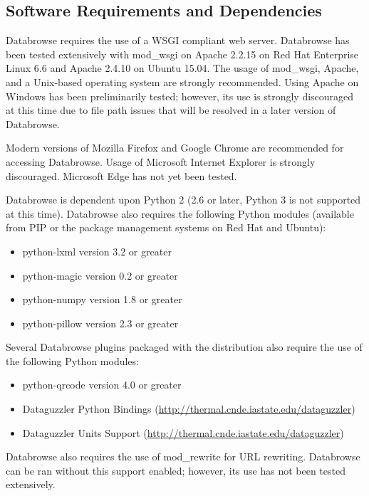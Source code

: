 \documentclass[10pt]{article}
\begin{document}
\subsection{Software Requirements and Dependencies}

Databrowse requires the use of a WSGI compliant web server.  Databrowse has been tested extensively with mod\_wsgi on Apache 2.2.15 on Red Hat Enterprise Linux 6.6 and Apache 2.4.10 on Ubuntu 15.04.  The usage of mod\_wsgi, Apache, and a Unix-based operating system are strongly recommended.  Using Apache on Windows has been preliminarily tested; however, its use is strongly discouraged at this time due to file path issues that will be resolved in a later version of Databrowse.

Modern versions of Mozilla Firefox and Google Chrome are recommended for accessing Databrowse.  Usage of Microsoft Internet Explorer is strongly discouraged.  Microsoft Edge has not yet been tested.

Databrowse is dependent upon Python 2 (2.6 or later, Python 3 is not supported at this time).  Databrowse also requires the following Python modules (available from PIP or the package management systems on Red Hat and Ubuntu):

\begin{itemize}
	\item python-lxml version 3.2 or greater
	\item python-magic version 0.2 or greater
	\item python-numpy version 1.8 or greater
	\item python-pillow version 2.3 or greater
	
\end{itemize}

Several Databrowse plugins packaged with the distribution also require the use of the following Python modules:

\begin{itemize}
	\item python-qrcode version 4.0 or greater
	\item Dataguzzler Python Bindings (\url{http://thermal.cnde.iastate.edu/dataguzzler})
	\item Dataguzzler Units Support (\url{http://thermal.cnde.iastate.edu/dataguzzler})
\end{itemize}

Databrowse also requires the use of mod\_rewrite for URL rewriting.  Databrowse can be ran without this support enabled; however, its use has not been tested extensively.
\end{document}
